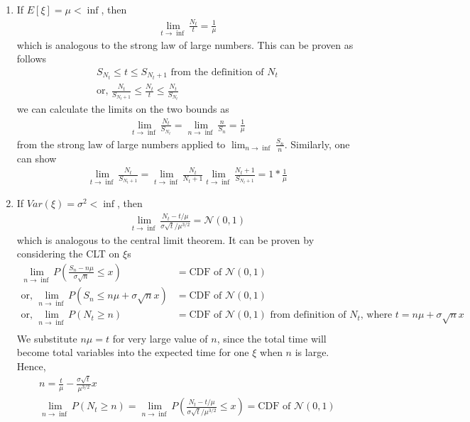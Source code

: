 \documentclass[../probability-notes.tex]{subfiles}
\begin{document}
    \begin{enumerate}
        \item If $E[\xi] = \mu < \inf$, then
        \begin{align*}
            \lim_{t \to \inf} \frac{N_{t}}{t} = \frac{1}{\mu}            
        \end{align*}
        which is analogous to the strong law of large numbers. This can be proven as follows
        \begin{align*}
            S_{N_{t}} \leq t \leq S_{N_{t} + 1} \text{ from the definition of $N_{t}$}\\
            \text{or, } \frac{N_{t}}{S_{N_{t} + 1}} \leq \frac{N_{t}}{t} \leq \frac{N_{t}}{S_{N_{t}}}
        \end{align*}
        we can calculate the limits on the two bounds as
        \begin{align*}
            \lim_{t \to \inf} \frac{N_{t}}{S_{N_{t}}} = \lim_{n \to \inf} \frac{n}{S_{n}} = \frac{1}{\mu}
        \end{align*}
        from the strong law of large numbers applied to $\lim_{n \to \inf} \frac{S_{n}}{n}$. Similarly, one can show
        \begin{align*}
            \lim_{t \to \inf} \frac{N_{t}}{S_{N_{t} + 1}} = \lim_{t \to \inf} \frac{N_{t}}{N_{t} + 1} \lim_{t \to \inf} \frac{N_{t} + 1}{S_{N_{t} + 1}} = 1 * \frac{1}{\mu}
        \end{align*}

        \item If $Var(\xi) = \sigma^{2} < \inf$, then
        \begin{align*}
            \lim_{t \to \inf} \frac{N_{t} - t/\mu}{\sigma \sqrt{t}/\mu^{3/2}} = \mathcal{N}(0,1)
        \end{align*}
        which is analogous to the central limit theorem. It can be proven by considering the CLT on $\xi$s
        \begin{align*}
            \lim_{n \to \inf} P(\frac{S_{n} - n\mu}{\sigma \sqrt{n}} \leq x) &= \text{CDF of }\mathcal{N}(0,1)\\
            \text{or, } \lim_{n \to \inf} P(S_{n} \leq n\mu + \sigma \sqrt{n} x) &= \text{CDF of }\mathcal{N}(0,1)\\
            \text{or, } \lim_{n \to \inf} P(N_{t} \geq n) &= \text{CDF of }\mathcal{N}(0,1) \text{ from definition of $N_{t}$, where $t = n\mu + \sigma \sqrt{n} x$}\\
        \end{align*}
        We substitute $n\mu = t$ for very large value of $n$, since the total time will become total variables into the expected time for one $\xi$ when $n$ is large. Hence,
        \begin{gather*}
            n = \frac{t}{\mu} - \frac{\sigma \sqrt{t}}{\mu^{3/2}}x\\
            \lim_{n \to \inf} P(N_{t} \geq n) = \lim_{n \to \inf} P(\frac{N_{t} - t/\mu}{\sigma \sqrt{t}/\mu^{3/2}} \leq x) = \text{CDF of }\mathcal{N}(0,1)
        \end{gather*}
    \end{enumerate}
\end{document}
